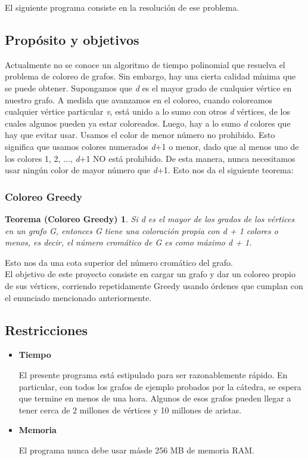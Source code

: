 \documentclass[11pt,a4paper]{article}
\theoremstyle{plain}
\begin{document}
 El siguiente programa consiste en la resolución de ese problema.

	\subsection{Propósito y objetivos}

Actualmente no se conoce un algoritmo de tiempo polinomial que resuelva el problema de coloreo de grafos. Sin embargo, hay una cierta calidad mínima que se puede obtener. Supongamos que \emph{d} es el mayor grado de cualquier vértice en nuestro grafo. A medida que avanzamos en el coloreo, cuando coloreamos cualquier vértice particular \emph{v}, está unido a lo sumo con otros \emph{d} vértices, de los cuales algunos pueden ya estar coloreados. Luego, hay a lo sumo \emph{d} colores que hay que evitar usar. Usamos el color de menor número no prohibido. Esto significa que usamos colores numerados \emph{d}+1 o menor, dado que al menos uno de los colores 1, 2, ..., \emph{d}+1 NO está prohibido. De esta manera, nunca necesitamos usar ningún color de mayor número que \emph{d}+1. Esto nos da el siguiente teorema:

\subsubsection{Coloreo Greedy}
\newtheorem*{Teorema*}{Teorema (Coloreo Greedy)}

\begin{Teorema*}
Si d es el mayor de los grados de los vértices en un grafo G, entonces G tiene una coloración propia con d + 1 colores o menos, es decir, el número cromático de G es como máximo d + 1.
\end{Teorema*}

 Esto nos da una cota superior del número cromático del grafo\cite {4}.\\

El objetivo de este proyecto consiste en cargar un grafo y dar un coloreo propio de sus vértices, corriendo repetidamente Greedy usando órdenes que cumplan con el enunciado mencionado anteriormente.

	\subsection{Restricciones}

\begin{itemize}

\item\textbf{{Tiempo}}

El presente programa está estipulado para ser razonablemente rápido. En particular, con todos los grafos de ejemplo probados por la cátedra, se espera que termine en menos de una hora. Algunos de esos grafos pueden llegar a tener cerca de 2 millones de vértices y 10 millones de aristas.

\item\textbf{{Memoria}}

El programa nunca debe usar másde 256 MB de memoria RAM.

\end{itemize}
\end{document}
